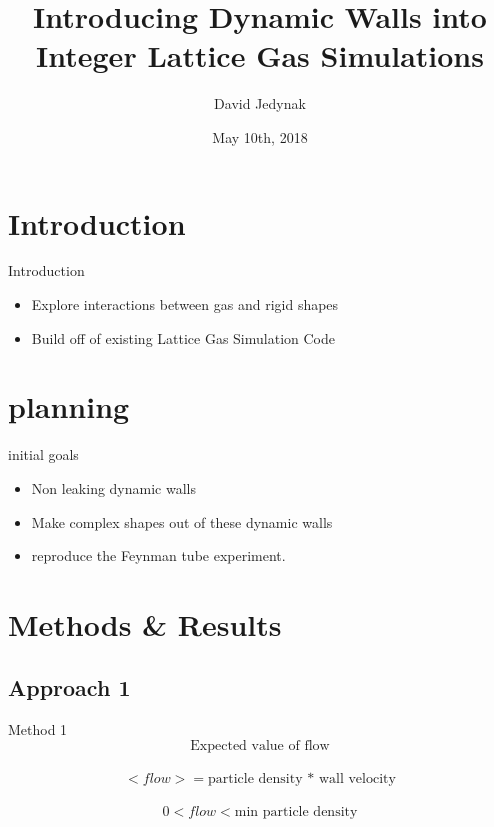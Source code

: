 \documentclass{beamer}
\title[Introducing Dynamic Walls into Integer Lattice Gas Simulations]{Introducing Dynamic Walls into Integer Lattice Gas Simulations}
\author{David Jedynak}
\institute{NDSU}
\date{May 10th, 2018}
\begin{document}
\begin{frame}
  \titlepage
\end{frame}


\section{Introduction}

\begin{frame}{Introduction}

\begin{itemize}
  \item Explore interactions between gas and rigid shapes
  \item Build off of existing Lattice Gas Simulation Code
\end{itemize}

\vskip 1cm

\end{frame}



\section{planning}
\begin{frame}{initial goals}
\begin{itemize}
\item Non leaking dynamic walls
\item Make complex shapes out of these dynamic walls
\item reproduce the Feynman tube experiment. 
\end{itemize}
\end{frame}

\section{Methods & Results}

\subsection{Approach 1}
\begin{frame}{Method 1}
$$
\textrm{Expected value of flow}$$\\
$$<flow> = \textrm{particle density * wall velocity}$$\\
$$0 < flow < \textrm{min particle density}$$\\
\end{frame}
\end{document}
